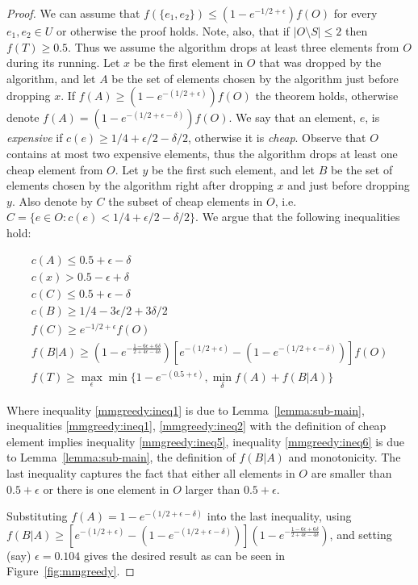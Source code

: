 \def\eps{0.104}
\begin{proof}
We can assume that $f(\{e_1, e_2\}) \leq (1 - e^{-1/2 + \epsilon})f(O)$ 
for every $e_1, e_2 \in U$ or otherwise the proof holds.
Note, also, that if $|O \setminus S| \leq 2$ then $f(T) \geq 0.5$.
Thus we assume the algorithm drops at least three elements from $O$ during its running.
Let $x$ be the first element in $O$ that was dropped by the algorithm, 
and let $A$ be the set of elements chosen by the algorithm just before dropping $x$.
If $f(A) \geq (1 - e^{-(1/2 + \epsilon)})f(O)$ the theorem holds, 
otherwise denote $f(A) = (1 - e^{-(1/2 + \epsilon - \delta)})f(O)$.
We say that an element, $e$, is \emph{expensive} if $c(e) \ge 1/4 + \epsilon/2 - \delta/2$, 
otherwise it is \emph{cheap}.
Observe that $O$ contains at most two expensive elements, thus the algorithm drops 
at least one cheap element from $O$. 
Let $y$ be the first such element, and let $B$ be the set of elements chosen by the 
algorithm right after dropping $x$ and just before dropping $y$.
Also denote by $C$ the subset of cheap elements in $O$, 
i.e. $C = \{e \in O : c(e) < 1/4 + \epsilon/2 - \delta/2\}$.
We argue that the following inequalities hold:

\begin{align}
\label{mmgreedy:ineq1}
c(A) \leq 0.5 + \epsilon - \delta 
\\
\label{mmgreedy:ineq2}
c(x) > 0.5 -\epsilon + \delta
\\
\label{mmgreedy:ineq3}
c(C) \leq 0.5 + \epsilon - \delta
\\
\label{mmgreedy:ineq5}
c(B) \ge 1/4 - 3\epsilon/2 + 3\delta/2
\\
\label{mmgreedy:ineq4}
f(C) \ge e^{-1/2 + \epsilon}f(O)
\\
\label{mmgreedy:ineq6}
f(B|A) \ge 
(1-e^{-\frac{1-6\epsilon+6\delta}{2+4\epsilon-4\delta}})
\left[
e^{-(1/2 + \epsilon)}
- (1 - e^{-(1/2 + \epsilon - \delta)})
\right]f(O)
\\
\label{mmgreedy:ineq7}
f(T) \geq \max_\epsilon \min \{1 - e^{-(0.5 + \epsilon)}, \min_{\delta} f(A) + f(B|A)\}
\end{align}

Where inequality \ref{mmgreedy:ineq1} is due to Lemma~\ref{lemma:sub-main},
inequalities \ref{mmgreedy:ineq1}, \ref{mmgreedy:ineq2} with the definition of cheap
element implies inequality \ref{mmgreedy:ineq5},
inequality \ref{mmgreedy:ineq6} is due to Lemma~\ref{lemma:sub-main}, the definition
of $f(B|A)$ and monotonicity.
The last inequality captures the fact that either all elements in $O$ are smaller than
$0.5 + \epsilon$ or there is one element in $O$ larger than $0.5 + \epsilon$.


Substituting $f(A) = 1 - e^{-(1/2 + \epsilon - \delta)}$ into the last inequality, 
using $f(B|A) \ge \left[
e^{-(1/2 + \epsilon)}
- (1 - e^{-(1/2 + \epsilon - \delta)})
\right]
(1-e^{-\frac{1-6\epsilon+6\delta}{2+4\epsilon-4\delta}})
$,
and setting (say) $\epsilon = \eps$ gives the desired result 
as can be seen in Figure~\ref{fig:mmgreedy}.

\end{proof}

